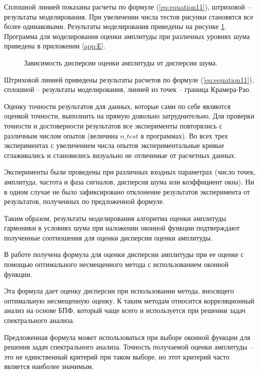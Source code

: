 Сплошной линией показаны расчеты по формуле (\ref{eq:equation11}), штриховой -- результаты моделирования. При увеличении числа тестов рисунки становятся все более одинаковыми. Результаты моделирования приведены на рисунке \ref{img:estimate_amp_sin_kaiser_noise}. Программа для моделирования оценки амплитуды при различных уровнях шума приведена в приложении \ref{app:Е}.
\begin{figure}[ht]
	\caption{Зависимость дисперсии оценки амплитуды от дисперсии шума.}\label{img:estimate_amp_sin_kaiser_noise}
\end{figure}

Штриховой линией приведены результаты расчетов по формуле (\ref{eq:equation11}), сплошной -- результаты моделирования, линией из точек -- граница Крамера-Рао.

Оценку точности результатов для данных, которые сами по себе являются оценкой точности, выполнить на прямую довольно затруднительно. Для проверки точности и достоверности результатов все эксперименты повторялись с различным числом опытов (величина $n\_test$ в программах). Во всех трех экспериментах с увеличением числа опытов экспериментальные кривые сглаживались и становились визуально не отличимые от расчетных данных.

Эксперименты были проведены при различных входных параметрах (число точек, амплитуда, частота и фаза сигналов, дисперсия шума или коэффициент окна). Ни в одном случае не было зафиксировано отклонение результатов эксперимента от результатов, полученных по предложенной формуле.

Таким образом, результаты моделирования алгоритма оценки амплитуды гармоники в условиях шума при наложении оконной функции подтверждают полученные соотношения для оценки дисперсии оценки амплитуды.

В работе получена формула для оценки дисперсии амплитуды при ее оценке с помощью оптимального несмещенного метода с использованием оконной функции.

Эта формула дает оценку дисперсии при использовании метода, вносящего оптимальную несмещенную оценку. К таким методам относится корреляционный анализ на основе БПФ, который чаще всего и используется при решении задач спектрального анализа.

Предложенная формула может использоваться при выборе оконной функции для решения задач спектрального анализа. Точность получаемой оценки амплитуды – это не единственный критерий при таком выборе, но этот критерий часто является наиболее значимым.

